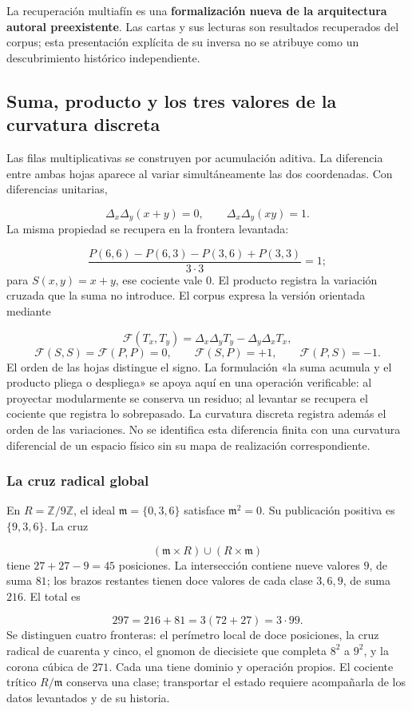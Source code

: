 La recuperación multiafín es una \textbf{formalización nueva de la arquitectura autoral preexistente}. Las cartas y sus lecturas son resultados recuperados del corpus; esta presentación explícita de su inversa no se atribuye como un descubrimiento histórico independiente.

\subsection{Suma, producto y los tres valores de la curvatura discreta}
Las filas multiplicativas se construyen por acumulación aditiva. La diferencia entre ambas hojas aparece al variar simultáneamente las dos coordenadas. Con diferencias unitarias,

\[
\Delta_x\Delta_y(x+y)=0,
\qquad
\Delta_x\Delta_y(xy)=1.
\]
La misma propiedad se recupera en la frontera levantada:

\[
\frac{P(6,6)-P(6,3)-P(3,6)+P(3,3)}{3\cdot3}=1;
\]
para \(S(x,y)=x+y\), ese cociente vale \(0\). El producto registra la variación cruzada que la suma no introduce. El corpus expresa la versión orientada mediante

\[
\mathcal F(T_x,T_y)=\Delta_x\Delta_yT_y-\Delta_y\Delta_xT_x,
\]
\[
\mathcal F(S,S)=\mathcal F(P,P)=0,
\qquad \mathcal F(S,P)=+1,
\qquad \mathcal F(P,S)=-1.
\]
El orden de las hojas distingue el signo. La formulación «la suma acumula y el producto pliega o despliega» se apoya aquí en una operación verificable: al proyectar modularmente se conserva un residuo; al levantar se recupera el cociente que registra lo sobrepasado. La curvatura discreta registra además el orden de las variaciones. No se identifica esta diferencia finita con una curvatura diferencial de un espacio físico sin su mapa de realización correspondiente.

\subsubsection*{La cruz radical global}
En \(R=\mathbb Z/9\mathbb Z\), el ideal \(\mathfrak m=\{0,3,6\}\) satisface \(\mathfrak m^2=0\). Su publicación positiva es \(\{9,3,6\}\). La cruz

\[
(\mathfrak m\times R)\cup(R\times\mathfrak m)
\]
tiene \(27+27-9=45\) posiciones. La intersección contiene nueve valores \(9\), de suma \(81\); los brazos restantes tienen doce valores de cada clase \(3,6,9\), de suma \(216\). El total es

\[
297=216+81=3(72+27)=3\cdot99.
\]
Se distinguen cuatro fronteras: el perímetro local de doce posiciones, la cruz radical de cuarenta y cinco, el gnomon de diecisiete que completa \(8^2\) a \(9^2\), y la corona cúbica de \(271\). Cada una tiene dominio y operación propios. El cociente trítico \(R/\mathfrak m\) conserva una clase; transportar el estado requiere acompañarla de los datos levantados y de su historia.

